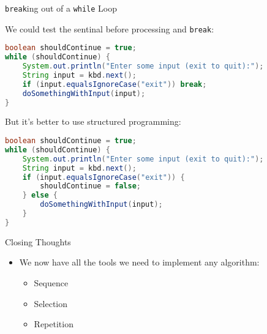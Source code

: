 \documentclass{beamer}
\begin{document}
\begin{frame}[fragile]{{\tt break}ing out of a {\tt while} Loop}


We could test the sentinal before processing and {\tt break}:
\vspace{-.05in}
\begin{lstlisting}[language=Java]
boolean shouldContinue = true;
while (shouldContinue) {
    System.out.println("Enter some input (exit to quit):");
    String input = kbd.next();
    if (input.equalsIgnoreCase("exit")) break;
    doSomethingWithInput(input);
}
\end{lstlisting}
\vspace{-.1in}
But it's better to use structured programming:
\vspace{-.05in}
\begin{lstlisting}[language=Java]
boolean shouldContinue = true;
while (shouldContinue) {
    System.out.println("Enter some input (exit to quit):");
    String input = kbd.next();
    if (input.equalsIgnoreCase("exit")) {
        shouldContinue = false;
    } else {
        doSomethingWithInput(input);
    }
}
\end{lstlisting}


\end{frame}


\begin{frame}[fragile]{Closing Thoughts}


\begin{itemize}
\item We now have all the tools we need to implement any algorithm:
\begin{itemize}
\item Sequence
\item Selection
\item Repetition
\end{itemize}
\end{itemize}


\end{frame}
\end{document}

